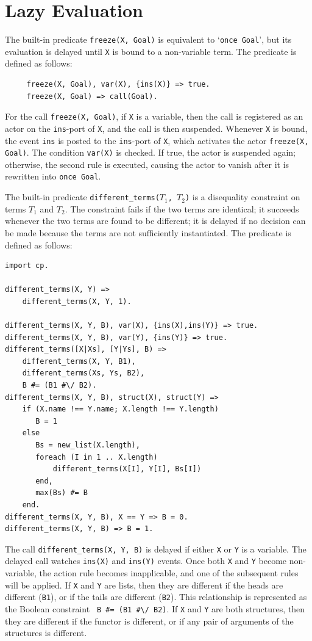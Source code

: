 \section{Lazy Evaluation}
The built-in predicate \texttt{freeze(X, Goal)} is equivalent to `\texttt{once Goal}', but its evaluation is delayed until \texttt{X} is bound to a non-variable term. The predicate is defined as follows:
\begin{verbatim}
     freeze(X, Goal), var(X), {ins(X)} => true.
     freeze(X, Goal) => call(Goal).
\end{verbatim}
For the call \texttt{freeze(X, Goal)}, if  \texttt{X} is a variable, then the call is registered as an actor on the \texttt{ins}-port of \texttt{X}, and the call is then suspended. Whenever \texttt{X} is bound, the event \texttt{ins} is posted to the \texttt{ins}-port of \texttt{X}, which activates the actor \texttt{freeze(X, Goal)}. The condition \texttt{var(X)} is checked. If true, the actor is suspended again; otherwise, the second rule is executed, causing the actor to vanish after it is rewritten into \texttt{once Goal}.

The built-in predicate \texttt{different\_terms($T_1$, $T_2$)} is a disequality constraint on terms $T_1$ and $T_2$. The constraint fails if the two terms are identical; it succeeds whenever the two terms are found to be different; it is delayed if no decision can be made because the terms are not sufficiently instantiated. The predicate is defined as follows:
\begin{verbatim}
import cp.

different_terms(X, Y) =>
    different_terms(X, Y, 1).

different_terms(X, Y, B), var(X), {ins(X),ins(Y)} => true.
different_terms(X, Y, B), var(Y), {ins(Y)} => true.
different_terms([X|Xs], [Y|Ys], B) =>
    different_terms(X, Y, B1),
    different_terms(Xs, Ys, B2),
    B #= (B1 #\/ B2).
different_terms(X, Y, B), struct(X), struct(Y) =>
    if (X.name !== Y.name; X.length !== Y.length)
       B = 1
    else
       Bs = new_list(X.length),
       foreach (I in 1 .. X.length)
           different_terms(X[I], Y[I], Bs[I])
       end,
       max(Bs) #= B
    end.
different_terms(X, Y, B), X == Y => B = 0.
different_terms(X, Y, B) => B = 1.
\end{verbatim}
The call \texttt{different\_terms(X, Y, B)} is delayed if either \texttt{X} or \texttt{Y} is a variable. The delayed call watches \texttt{ins(X)} and  \texttt{ins(Y)} events. Once both \texttt{X} and \texttt{Y} become non-variable, the action rule becomes inapplicable, and one of the subsequent rules will be applied. If \texttt{X} and \texttt{Y} are lists, then they are different if the heads are different (\verb+B1+), or if the tails are different (\verb+B2+).  This relationship is represented as the Boolean constraint \verb+ B #= (B1 #\/ B2)+. If \texttt{X} and \texttt{Y} are both structures, then they are different if the functor is different, or if any pair of arguments of the structures is different.



